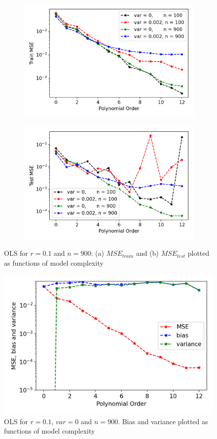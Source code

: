 \begin{figure}[htb]
\centering
\begin{subfigure}{.5\textwidth}
  \centering
  \includegraphics[width=.9\linewidth]{Images/ols5.png}
  \caption{}
  \label{fig:ols4}
\end{subfigure}%
\begin{subfigure}{.5\textwidth}
  \centering
  \includegraphics[width=.9\linewidth]{Images/ols4.png}
  \caption{}
  \label{fig:ols5}
\end{subfigure}
\caption{OLS for $r=0.1$ and $n=900$: (a) $MSE_{train}$ and (b) $MSE_{test}$ plotted as functions of model complexity}
\label{fig:OLS2}
\end{figure}

\begin{figure}[htb]
\centering
\includegraphics[width=.7\linewidth]{Images/ols7.png}
\caption{OLS for $r=0.1$, $var=0$ and $n=900$. Bias and variance plotted as functions of model complexity}
\label{fig:OLS3}
\end{figure}

